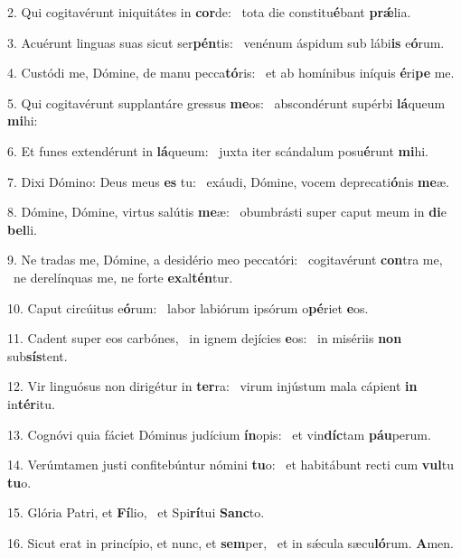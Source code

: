 2. Qui cogitavérunt iniquitátes in \textbf{cor}de: \ast\  tota die constitu\textbf{é}bant \textbf{prǽ}lia.\

3. Acuérunt linguas suas sicut ser\textbf{pén}tis: \ast\  venénum áspidum sub lábi\textbf{is} e\textbf{ó}rum.\

4. Custódi me, Dómine, de manu pecca\textbf{tó}ris: \ast\  et ab homínibus iníquis \textbf{é}ri\textbf{pe} me.\

5. Qui cogitavérunt supplantáre gressus \textbf{me}os: \ast\  abscondérunt supérbi \textbf{lá}queum \textbf{mi}hi:\

6. Et funes extendérunt in \textbf{lá}queum: \ast\  juxta iter scándalum posu\textbf{é}runt \textbf{mi}hi.\

7. Dixi Dómino: Deus meus \textbf{es} tu: \ast\  exáudi, Dómine, vocem deprecati\textbf{ó}nis \textbf{me}æ.\

8. Dómine, Dómine, virtus salútis \textbf{me}æ: \ast\  obumbrásti super caput meum in \textbf{di}e \textbf{bel}li.\

9. Ne tradas me, Dómine, a desidério meo peccatóri: \dag\  cogitavérunt \textbf{con}tra me, \ast\  ne derelínquas me, ne forte \textbf{ex}al\textbf{tén}tur.\

10. Caput circúitus e\textbf{ó}rum: \ast\  labor labiórum ipsórum o\textbf{pé}riet \textbf{e}os.\

11. Cadent super eos carbónes, \dag\  in ignem dejícies \textbf{e}os: \ast\  in misériis \textbf{non} sub\textbf{sís}tent.\

12. Vir linguósus non dirigétur in \textbf{ter}ra: \ast\  virum injústum mala cápient \textbf{in} in\textbf{tér}itu.\

13. Cognóvi quia fáciet Dóminus judícium \textbf{ín}opis: \ast\  et vin\textbf{díc}tam \textbf{páu}perum.\

14. Verúmtamen justi confitebúntur nómini \textbf{tu}o: \ast\  et habitábunt recti cum \textbf{vul}tu \textbf{tu}o.\

15. Glória Patri, et \textbf{Fí}lio, \ast\  et Spi\textbf{rí}tui \textbf{Sanc}to.\

16. Sicut erat in princípio, et nunc, et \textbf{sem}per, \ast\  et in sǽcula sæcu\textbf{ló}rum. \textbf{A}men.\

